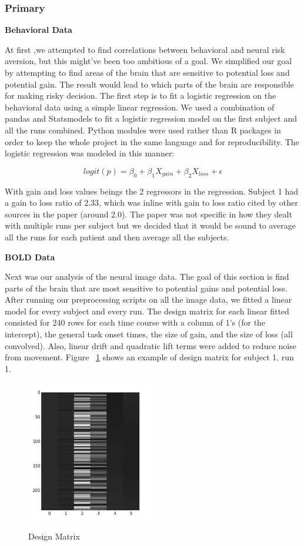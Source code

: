 \documentclass[11pt]{article}
\begin{document}
\subsubsection{Primary}

\textbf{Behavioral Data}

At first ,we attempted to find correlations between behavioral and neural risk
aversion, but this might’ve been too ambitious of a goal. We simplified our
goal by attempting to find areas of the brain that are sensitive to potential
loss and potential gain. The result would lead to which parts of the brain are
responsible for making risky decision. The first step is to fit a logistic
regression on the behavioral data using a simple linear regression. We used a
combination of pandas and Statsmodels to fit a logistic regression model on the
first subject and all the runs combined. Python modules were used rather than R
packages in order to keep the whole project in the same language and for
reproducibility. The logistic regression was modeled in this manner:

\[ logit(p) = \beta_0 + \beta_1 X_{gain} + \beta_2 X_{loss} + \epsilon \] 

With gain and loss values beings the 2 regressors in the regression. Subject 1
had a gain to loss ratio of 2.33, which was inline with gain to loss ratio
cited by other sources in the paper (around 2.0). The paper was not specific in
how they dealt with multiple runs per subject but we decided that it would be
sound to average all the runs for each patient and then average all the
subjects.

\textbf{BOLD Data}

Next was our analysis of the neural image data. The goal of this section is
find parts of the brain that are most sensitive to potential gains and
potential loss. After running our preprocessing scripts on all the image data,
we fitted a linear model for every subject and every run. The design matrix for
each linear fitted consisted for 240 rows for each time course with a column of
1’s (for the intercept), the general task onset times, the size of gain, and
the size of loss (all convolved). Also, linear drift and quadratic lift terms
were added to reduce noise from movement. Figure ~\ref{fig:design-matrix}
shows an example of design matrix for subject 1, run 1.

\begin{figure}[h]
\caption{Design Matrix}
\centering
\includegraphics[width=0.5\textwidth]{design-matrix.png}
\label{fig:design-matrix}
\end{figure}
\end{document}
